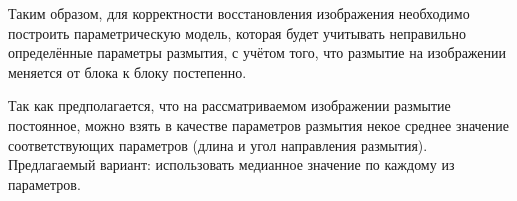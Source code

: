 Таким образом, для корректности восстановления изображения необходимо построить параметрическую модель, 
которая будет учитывать неправильно определённые параметры размытия, с учётом того, что размытие на изображении
меняется от блока к блоку постепенно.

Так как предполагается, что на рассматриваемом изображении размытие постоянное,
можно взять в качестве параметров размытия некое среднее значение соответствующих параметров
(длина и угол направления размытия). Предлагаемый вариант: использовать медианное значение по каждому из параметров.

\begin{figure}[H]
\begin{minipage}[h]{0.4\linewidth}
 \\ 
\end{minipage}
\hfill
\begin{minipage}[h]{0.4\linewidth}

\end{minipage}
\end{figure}
